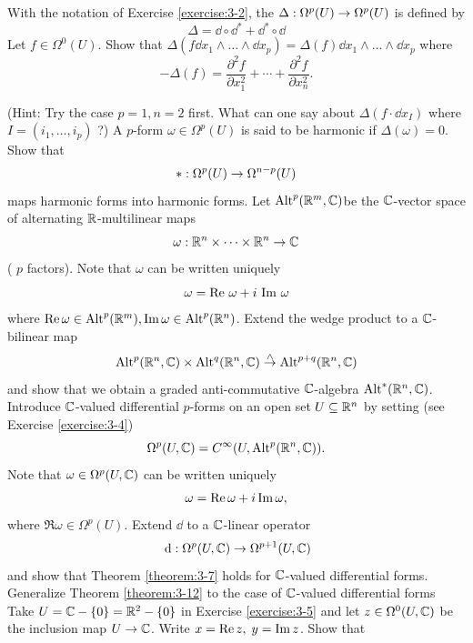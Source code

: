 \begin{enumerate}[label=\theexercise.\arabic*.,ref=\theexercise.\arabic*,leftmargin=2.7em]
\[    \]
  \NewItem With the notation of Exercise \ref{exercise:3-2}, the  $\Delta  : {\Omega }^{p}( U)  \rightarrow  {\Omega }^{p}( U)$ is defined by
    \[
      \Delta  = \dd \circ  {\dd}^* + {\dd}^* \circ  \dd
    \]
    Let $f \in  {\Omega }^{0}( U)$. Show that $\Delta ( {{f\dd}{x}_{1} \land  \ldots  \land  \dd{x}_{p}})  = \Delta ( f) \dd{x}_{1} \land  \ldots  \land  \dd{x}_{p}$
    where
    \[
      - \Delta ( f)  = \frac{{\partial }^{2}f}{\partial {x}_{1}^{2}} + \cdots  + \frac{{\partial }^{2}f}{\partial {x}_{n}^{2}}.
    \]
    \par(Hint: Try the case $p = 1,n = 2$ first. What can one say about $\Delta ( {f \cdot  \dd{x}_{I}})$ where $I = ( {{i}_{1},\ldots,{i}_{p}})$ ?)
    A $p$-form $\omega  \in  {\Omega }^{p}( U)$ is said to be harmonic if $\Delta ( \omega )  = 0$. Show that
    \[
      *  : {\Omega }^{p}( U)  \rightarrow  {\Omega }^{n- p}( U)
    \]
    maps harmonic forms into harmonic forms.
  \NewItem Let ${\operatorname{Alt}}^{p}( {{\mathbb{R}}^{m},\mathbb{C}})$be the $\mathbb{C}$-vector space of alternating $\mathbb{R}$-multilinear maps
    \[
      \omega  : {\mathbb{R}}^{n} \times  \cdots  \times  {\ensuremath{\mathbb{R}}}^{n} \rightarrow  \mathbb{C}
    \]
    ( $p$ factors). Note that $\omega$ can be written uniquely
    \[
      \omega  = \operatorname{Re}\,\omega  + i\,\operatorname{Im}\,\omega
    \]
    where $\operatorname{Re}\omega  \in  {\operatorname{Alt}}^{p}( {\mathbb{R}}^{m}),\operatorname{Im}\omega  \in  {\operatorname{Alt}}^{p}( {\mathbb{R}}^{n})$.
    Extend the wedge product to a $\mathbb{C}$-bilinear map
    \[
      {\operatorname{Alt}}^{p}( {{\mathbb{R}}^{n},\mathbb{C}})  \times  {\operatorname{Alt}}^{q}( {{\mathbb{R}}^{n},\mathbb{C}}) \overset{ \land  }{ \rightarrow  }{\operatorname{Alt}}^{p + q}( {{\mathbb{R}}^{n},\mathbb{C}})
    \]
    and show that we obtain a graded anti-commutative $\mathbb{C}$-algebra ${\operatorname{Alt}}^*( {{\mathbb{R}}^{n},\mathbb{C}})$.
  \NewItem Introduce $\mathbb{C}$-valued differential $p$-forms on an open set $U \subseteq  {\ensuremath{\mathbb{R}}}^{n}$ by setting (see Exercise \ref{exercise:3-4})
    \[
      {\Omega }^{p}( {U,\mathbb{C}})  = {C}^{\infty }( {U,{\operatorname{Alt}}^{p}( {{\mathbb{R}}^{n},\mathbb{C}}) }).
    \]
    Note that $\omega  \in  {\Omega }^{p}( {U,\mathbb{C}})$ can be written uniquely
    \[
      \omega  = \operatorname{Re}\omega  + i\operatorname{Im}\omega,
    \]
    where $\Re\omega  \in  {\Omega }^{p}( U)$. Extend $\dd$ to a $\mathbb{C}$-linear operator
    \[
      \dd: {\Omega }^{p}( {U,\B{C}})  \ra  {\Omega }^{p + 1}( {U,\B{C}})
    \]
    and show that Theorem \ref{theorem:3-7} holds for $\mathbb{C}$-valued differential forms. Generalize Theorem \ref{theorem:3-12} to the case of $\mathbb{C}$-valued differential forms
  \NewItem Take $U = \mathbb{C}- \{ 0\}  = {\mathbb{R}}^{2}- \{ 0\}$ in Exercise \ref{exercise:3-5} and let $z \in  {\Omega }^{0}( {U,\mathbb{C}})$ be the inclusion map $U \rightarrow  \mathbb{C}$. Write $x = \operatorname{Re} z,\; y = \operatorname{Im} z$. Show that

\end{enumerate}
